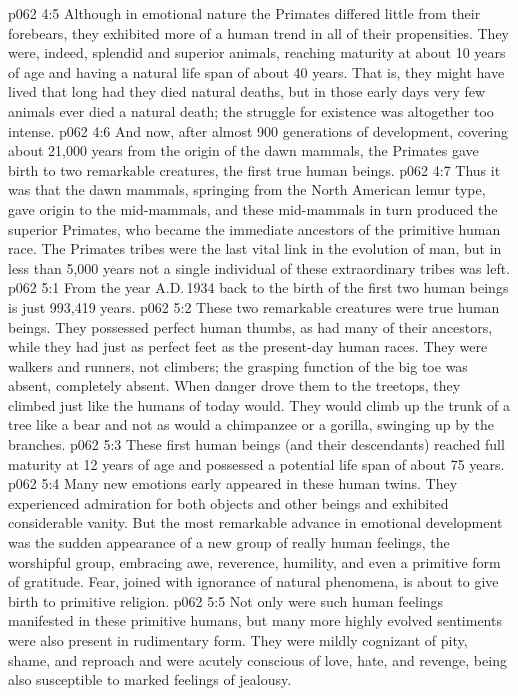 \vs p062 4:5 Although in emotional nature the Primates differed little from their forebears, they exhibited more of a human trend in all of their propensities. They were, indeed, splendid and superior animals, reaching maturity at about 10 years of age and having a natural life span of about 40 years. That is, they might have lived that long had they died natural deaths, but in those early days very few animals ever died a natural death; the struggle for existence was altogether too intense.
\vs p062 4:6 And now, after almost 900 generations of development, covering about 21,000 years from the origin of the dawn mammals, the Primates  gave birth to two remarkable creatures, the first true human beings.
\vs p062 4:7 \pc Thus it was that the dawn mammals, springing from the North American lemur type, gave origin to the mid\hyp{}mammals, and these mid\hyp{}mammals in turn produced the superior Primates, who became the immediate ancestors of the primitive human race. The Primates tribes were the last vital link in the evolution of man, but in less than 5,000 years not a single individual of these extraordinary tribes was left.
\vs p062 5:1 From the year A.D.\,1934 back to the birth of the first two human beings is just 993,419 years.
\vs p062 5:2 These two remarkable creatures were true human beings. They possessed perfect human thumbs, as had many of their ancestors, while they had just as perfect feet as the present\hyp{}day human races. They were walkers and runners, not climbers; the grasping function of the big toe was absent, completely absent. When danger drove them to the treetops, they climbed just like the humans of today would. They would climb up the trunk of a tree like a bear and not as would a chimpanzee or a gorilla, swinging up by the branches.
\vs p062 5:3 These first human beings (and their descendants) reached full maturity at 12 years of age and possessed a potential life span of about 75 years.
\vs p062 5:4 Many new emotions early appeared in these human twins. They experienced admiration for both objects and other beings and exhibited considerable vanity. But the most remarkable advance in emotional development was the sudden appearance of a new group of really human feelings, the worshipful group, embracing awe, reverence, humility, and even a primitive form of gratitude. Fear, joined with ignorance of natural phenomena, is about to give birth to primitive religion.
\vs p062 5:5 Not only were such human feelings manifested in these primitive humans, but many more highly evolved sentiments were also present in rudimentary form. They were mildly cognizant of pity, shame, and reproach and were acutely conscious of love, hate, and revenge, being also susceptible to marked feelings of jealousy.
